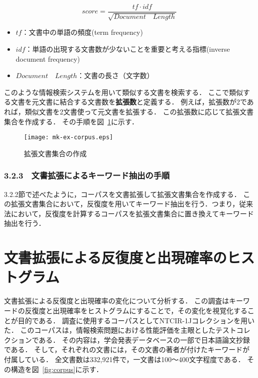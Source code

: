 \documentclass[japanese]{jnlp_1.2c}
\begin{document}
\[score=\frac{tf \cdot idf}{\sqrt{Document \quad Length}}\]

\begin{itemize}
\item 
$tf$：文書中の単語の頻度(term frequency)
\item
$idf$：単語の出現する文書数が少ないことを重要と考える指標(inverse document frequency)
\item
$Document \quad Length$：文書の長さ（文字数）
\end{itemize}
このような情報検索システムを用いて類似する文書を検索する．
ここで類似する文書を元文書に結合する文書数を{\bf 拡張数}と定義する．
例えば，拡張数が2であれば，類似文書を2文書使って元文書を拡張する．
この拡張数に応じて拡張文書集合を作成する．
その手順を図~\ref{fig:mk-ex-corpus}に示す．


\begin{figure}[t]
	\begin{center}
		\texttt{[image: mk-ex-corpus.eps]}
	\end{center}
	\caption{拡張文書集合の作成}
	\label{fig:mk-ex-corpus}
\vspace{-2\baselineskip}
\end{figure}

\subsubsection{3.2.3　文書拡張によるキーワード抽出の手順}
3.2.2節で述べたように，コーパスを文書拡張して拡張文書集合を作成する．
この拡張文書集合において，反復度を用いてキーワード抽出を行う．つまり，従来法において，反復度を計算するコーパスを拡張文書集合に置き換えてキーワード抽出を行う．
\section{文書拡張による反復度と出現確率のヒストグラム}
文書拡張による反復度と出現確率の変化について分析する．
この調査はキーワードの反復度と出現確率をヒストグラムにすることで，その変化を視覚化することが目的である．
調査に使用するコーパスとしてNTCIR-1Jコレクション\cite{Kando2001}を用いた．
このコーパスは，情報検索問題における性能評価を主眼としたテストコレクションである．
その内容は，学会発表データベースの一部で日本語論文抄録である．
そして，それぞれの文書には，その文書の著者が付けたキーワードが付属している．
全文書数は332,921件で，一文書は100〜400文字程度である．
その構造を図~\ref{fig:corpus}に示す．
\end{document}
